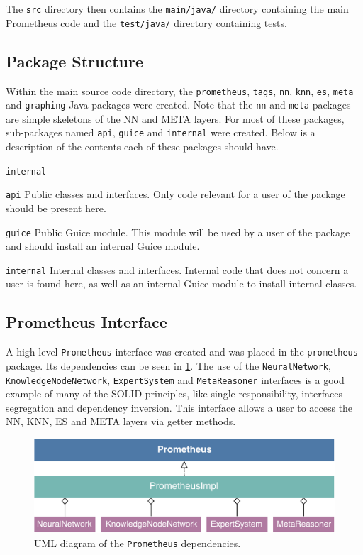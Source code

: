 \documentclass[titlepage,11pt]{article}
\newcommand{\code}[1]{\texttt{#1}}
\begin{document}
The \code{src} directory then contains the \code{main/java/} directory containing the main Prometheus code and the \code{test/java/} directory containing tests.

\subsection{Package Structure}
Within the main source code directory, the \code{prometheus}, \code{tags}, \code{nn}, \code{knn}, \code{es}, \code{meta} and \code{graphing} Java packages were created. Note that the \code{nn} and \code{meta} packages are simple skeletons of the NN and META layers. For most of these packages, sub-packages named \code{api}, \code{guice} and \code{internal} were created. Below is a description of the contents each of these packages should have.

\begin{labeling}{\code{internal}}
	\item[\code{api}] Public classes and interfaces. Only code relevant for a user of the package should be present here.
	\item[\code{guice}] Public Guice module. This module will be used by a user of the package and should install an internal Guice module.
	\item[\code{internal}] Internal classes and interfaces. Internal code that does not concern a user is found here, as well as an internal Guice module to install internal classes.
\end{labeling}

\subsection{Prometheus Interface}
A high-level \code{Prometheus} interface was created and was placed in the \code{prometheus} package. Its dependencies can be seen in \cref{fig:uml_prometheus}. The use of the \code{NeuralNetwork}, \code{KnowledgeNodeNetwork}, \code{ExpertSystem} and \code{MetaReasoner} interfaces is a good example of many of the SOLID principles, like single responsibility, interfaces segregation and dependency inversion. This interface allows a user to access the NN, KNN, ES and META layers via getter methods.

\begin{figure}[!htb]
	\includegraphics[width=\columnwidth]{figures/uml_prometheus.pdf}
	\caption{UML diagram of the \code{Prometheus} dependencies.}
	\label{fig:uml_prometheus}
\end{figure}
\end{document}
